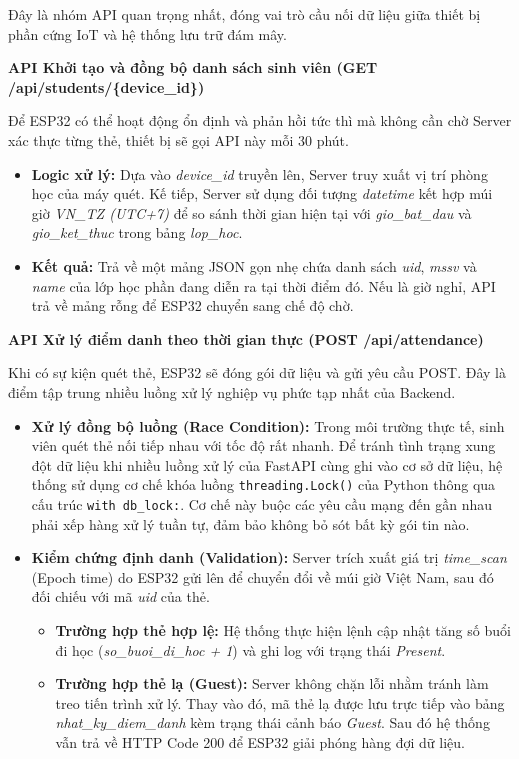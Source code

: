 \documentclass[12pt,a4paper]{report}
\begin{document}
Đây là nhóm API quan trọng nhất, đóng vai trò cầu nối dữ liệu giữa thiết bị phần cứng IoT và hệ thống lưu trữ đám mây.

\textbf{API Khởi tạo và đồng bộ danh sách sinh viên (GET /api/students/\{device\_id\})}

Để ESP32 có thể hoạt động ổn định và phản hồi tức thì mà không cần chờ Server xác thực từng thẻ, thiết bị sẽ gọi API này mỗi 30 phút.

\begin{itemize}
\item \textbf{Logic xử lý:}  
Dựa vào \textit{device\_id} truyền lên, Server truy xuất vị trí phòng học của máy quét. Kế tiếp, Server sử dụng đối tượng \textit{datetime} kết hợp múi giờ \textit{VN\_TZ (UTC+7)} để so sánh thời gian hiện tại với \textit{gio\_bat\_dau} và \textit{gio\_ket\_thuc} trong bảng \textit{lop\_hoc}.

\item \textbf{Kết quả:}  
Trả về một mảng JSON gọn nhẹ chứa danh sách \textit{uid}, \textit{mssv} và \textit{name} của lớp học phần đang diễn ra tại thời điểm đó. Nếu là giờ nghỉ, API trả về mảng rỗng để ESP32 chuyển sang chế độ chờ.
\end{itemize}

\textbf{API Xử lý điểm danh theo thời gian thực (POST /api/attendance)}

Khi có sự kiện quét thẻ, ESP32 sẽ đóng gói dữ liệu và gửi yêu cầu POST. Đây là điểm tập trung nhiều luồng xử lý nghiệp vụ phức tạp nhất của Backend.

\begin{itemize}
\item \textbf{Xử lý đồng bộ luồng (Race Condition):}  
Trong môi trường thực tế, sinh viên quét thẻ nối tiếp nhau với tốc độ rất nhanh. Để tránh tình trạng xung đột dữ liệu khi nhiều luồng xử lý của FastAPI cùng ghi vào cơ sở dữ liệu, hệ thống sử dụng cơ chế khóa luồng \texttt{threading.Lock()} của Python thông qua cấu trúc \texttt{with db\_lock:}.  
Cơ chế này buộc các yêu cầu mạng đến gần nhau phải xếp hàng xử lý tuần tự, đảm bảo không bỏ sót bất kỳ gói tin nào.

\item \textbf{Kiểm chứng định danh (Validation):}  
Server trích xuất giá trị \textit{time\_scan} (Epoch time) do ESP32 gửi lên để chuyển đổi về múi giờ Việt Nam, sau đó đối chiếu với mã \textit{uid} của thẻ.

\begin{itemize}
\item \textbf{Trường hợp thẻ hợp lệ:}  
Hệ thống thực hiện lệnh cập nhật tăng số buổi đi học (\textit{so\_buoi\_di\_hoc + 1}) và ghi log với trạng thái \textit{Present}.

\item \textbf{Trường hợp thẻ lạ (Guest):}  
Server không chặn lỗi nhằm tránh làm treo tiến trình xử lý. Thay vào đó, mã thẻ lạ được lưu trực tiếp vào bảng \textit{nhat\_ky\_diem\_danh} kèm trạng thái cảnh báo \textit{Guest}. Sau đó hệ thống vẫn trả về HTTP Code 200 để ESP32 giải phóng hàng đợi dữ liệu.
\end{itemize}

\end{itemize}
\end{document}

